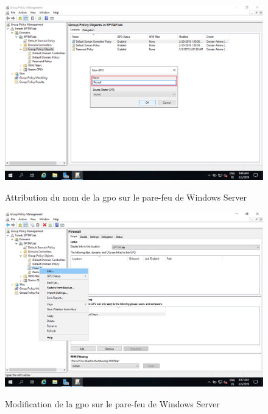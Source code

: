 \begin{figure}[h!]
	\begin{center}
		\caption{Attribution du nom de la gpo sur le pare-feu de Windows Server}
		\includegraphics[scale=0.5]{WS_Screenshots/gpo_14.png}
		\label{WS_Screenshots/gpo_14}
	\end{center}
\end{figure}
\FloatBarrier 
    

\begin{figure}[h!]
	\begin{center}
		\caption{Modification de la gpo sur le pare-feu de Windows Server}
		\includegraphics[scale=0.5]{WS_Screenshots/gpo_15.png}
		\label{WS_Screenshots/gpo_15}
	\end{center}
\end{figure}
\FloatBarrier 
    

